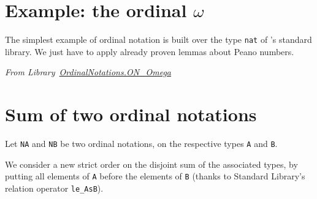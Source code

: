 

            



\section{Example: the ordinal \texorpdfstring{$\omega$}{omega}}




The simplest example of ordinal notation is built over the type \texttt{nat} of \coq's standard library. We just have to apply already proven lemmas about Peano numbers.

\vspace{4pt}
\noindent\emph{From Library~\href{../theories/html/hydras.OrdinalNotations.ON_Omega.html}{OrdinalNotations.ON\_Omega}}



\section{Sum of  two ordinal notations}

Let \texttt{NA} and \texttt{NB} be two ordinal notations, on the respective types \texttt{A} and \texttt{B}.

 We consider a new strict order
on the disjoint sum of the associated types, by putting all elements of \texttt{A} before the elements of \texttt{B} (thanks to Standard Library's relation operator \texttt{le\_AsB}).

